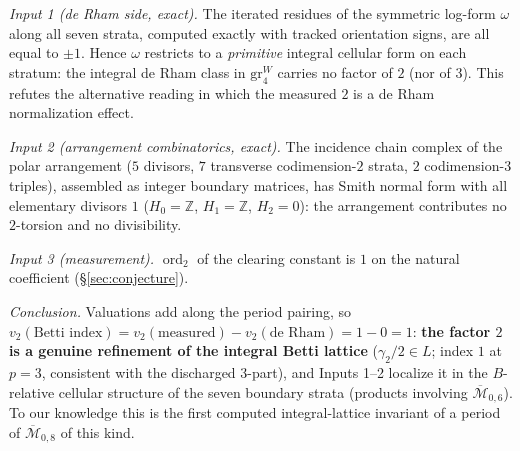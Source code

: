 \documentclass[11pt]{article}
\theoremstyle{definition}
\newcommand{\ord}{\operatorname{ord}}
\newcommand{\Z}{\mathbb{Z}}
\begin{document}
\emph{Input 1 (de Rham side, exact).} The iterated residues of the
symmetric log-form $\omega$ along all seven strata, computed exactly
with tracked orientation signs, are all equal to $\pm1$. Hence
$\omega$ restricts to a \emph{primitive} integral cellular form on
each stratum: the integral de Rham class in $\mathrm{gr}^W_4$ carries
no factor of $2$ (nor of $3$). This refutes the alternative reading in
which the measured $2$ is a de Rham normalization effect.

\emph{Input 2 (arrangement combinatorics, exact).} The incidence chain
complex of the polar arrangement ($5$ divisors, $7$ transverse
codimension-$2$ strata, $2$ codimension-$3$ triples), assembled as
integer boundary matrices, has Smith normal form with all elementary
divisors $1$ ($H_0=\Z$, $H_1=\Z$, $H_2=0$): the arrangement
contributes no $2$-torsion and no divisibility.

\emph{Input 3 (measurement).} $\ord_2$ of the clearing constant is
$1$ on the natural coefficient (\S\ref{sec:conjecture}).

\emph{Conclusion.} Valuations add along the period pairing, so
$v_2(\text{Betti index})=v_2(\text{measured})-v_2(\text{de Rham})
=1-0=1$: \textbf{the factor $2$ is a genuine refinement of the
integral Betti lattice} ($\gamma_2/2\in L$; index $1$ at $p=3$,
consistent with the discharged $3$-part), and Inputs 1--2 localize it
in the $B$-relative cellular structure of the seven boundary strata
(products involving $\overline{\mathcal M}_{0,6}$). To our knowledge
this is the first computed integral-lattice invariant of a period of
$\overline{\mathcal M}_{0,8}$ of this kind.
\end{document}
